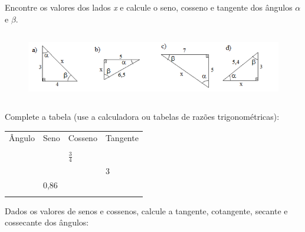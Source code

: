 \begin{exercicios}

\exitem{} Encontre os valores dos lados \textit{x} e calcule o seno, cosseno e tangente dos ângulos $\alpha$ e $\beta$.

\begin{figure}[H]
    \begin{Center}
        \includegraphics[width=5.91in,height=1.18in]{capitulos/trigonometria_e_funcoes_trigonometricas/media/image23.png}
    \end{Center}
\end{figure}

\exitem{} Complete a tabela (use a calculadora ou tabelas de razões trigonométricas):

\begin{table}[H]
             \centering
\begin{tabular}{p{0.49in}p{0.49in}p{0.52in}p{0.57in}}
\hline
\multicolumn{1}{|p{0.49in}}{Ângulo } &
\multicolumn{1}{|p{0.49in}}{Seno } &
\multicolumn{1}{|p{0.52in}}{Cosseno } &
\multicolumn{1}{|p{0.57in}|}{Tangente } \\
\hhline{----}
\multicolumn{1}{|p{0.49in}}{46\degree } &
\multicolumn{1}{|p{0.49in}}{} &
\multicolumn{1}{|p{0.52in}}{} &
\multicolumn{1}{|p{0.57in}|}{} \\
\hhline{----}
\multicolumn{1}{|p{0.49in}}{} &
\multicolumn{1}{|p{0.49in}}{} &
\multicolumn{1}{|p{0.52in}}{$\frac{3}{4}$ } &
\multicolumn{1}{|p{0.57in}|}{} \\
\hhline{----}
\multicolumn{1}{|p{0.49in}}{} &
\multicolumn{1}{|p{0.49in}}{} &
\multicolumn{1}{|p{0.52in}}{} &
\multicolumn{1}{|p{0.57in}|}{3} \\
\hhline{----}
\multicolumn{1}{|p{0.49in}}{} &
\multicolumn{1}{|p{0.49in}}{0,86} &
\multicolumn{1}{|p{0.52in}}{} &
\multicolumn{1}{|p{0.57in}|}{} \\
\hhline{----}

\end{tabular}
 \end{table}

\exitem{} Dados os valores de senos e cossenos, calcule a tangente, cotangente, secante e cossecante dos ângulos:


\end{exercicios}
